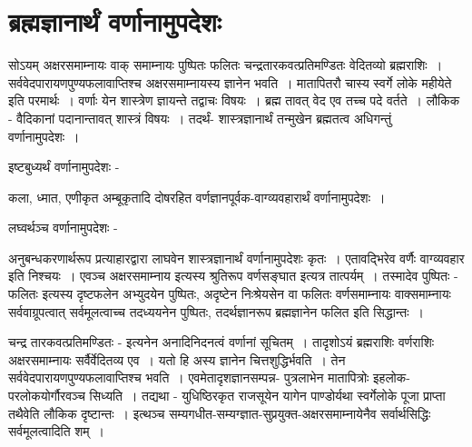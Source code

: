 {\section*{ब्रह्मज्ञानार्थं वर्णानामुपदेशः}	

सोऽयम् अक्षरसमाम्नायः वाक् समाम्नायः पुष्पितः फलितः चन्द्रतारकवत्प्रतिमण्डितः वेदितव्यो ब्रह्मराशिः~। सर्ववेदपारायणपुण्यफलावाप्तिश्च अक्षरसमाम्नायस्य ज्ञानेन भवति~। मातापितरौ चास्य स्वर्गे लोके महीयेते इति परमार्थः~। वर्णाः येन शास्त्रेण ज्ञायन्ते तद्वाचः विषयः~। ब्रह्म तावत् वेद एव तच्च पदे वर्तते~। लौकिक - वैदिकानां पदानान्तावत्  शास्त्रं विषयः~। तदर्थं- शास्त्रज्ञानार्थं तन्मुखेन ब्रह्मतत्व अधिगन्तुं वर्णानामुपदेशः~। 	

इष्टबुध्यर्थं वर्णानामुपदेशः -

कला, ध्मात, एणीकृत अम्बूकृतादि दोषरहित वर्णज्ञानपूर्वक-वाग्व्यवहारार्थं वर्णानामुपदेशः~। 

लघ्वर्थञ्च वर्णानामुपदेशः -	

अनुबन्धकरणार्थरूप प्रत्याहारद्वारा लाघवेन शास्त्रज्ञानार्थं वर्णानामुपदेशः कृतः~। एतावद्भिरेव वर्णैः वाग्व्यवहार इति निश्चयः~। एवञ्च अक्षरसमाम्नाय इत्यस्य श्रुतिरूप वर्णसङ्घात इत्यत्र तात्पर्यम्~। तस्मादेव पुष्पितः - फलितः इत्यस्य दृष्टफलेन अभ्युदयेन पुष्पितः, अदृष्टेन निःश्रेयसेन  वा फलितः वर्णसमाम्नायः वाक्समाम्नायः सर्ववाग्रूपत्वात् सर्वमूलत्वाच्च तदध्ययनेन पुष्पितः, तदर्थज्ञानरूप ब्रह्मज्ञानेन फलित इति सिद्धान्तः~। 

चन्द्र तारकवत्प्रतिमण्डितः  - इत्यनेन अनादिनिदनत्वं वर्णानां सूचितम्~। तादृशोऽयं ब्रह्मराशिः वर्णराशिः अक्षरसमाम्नायः सर्वैर्वेदितव्य एव~। यतो हि अस्य ज्ञानेन चित्तशुद्धिर्भवति~। तेन सर्ववेदपारायणपुण्यफलावाप्तिश्च भवति~। एवमेतादृशज्ञानसम्पन्न- पुत्रलाभेन मातापित्रोः इहलोक-परलोकयोर्गौरवञ्च सिध्यति~। तद्यथा - युधिष्ठिरकृत राजसूयेन यागेन पाण्डोर्यथा स्वर्गेलोके पूजा प्राप्ता तथैवेति लौकिक दृष्टान्तः~। इत्थञ्च सम्यगधीत-सम्यग्ज्ञात-सुप्रयुक्त-अक्षरसमाम्नायेनैव सर्वार्थसिद्धिः सर्वमूलत्वादिति शम्~। 

\articleend
}
